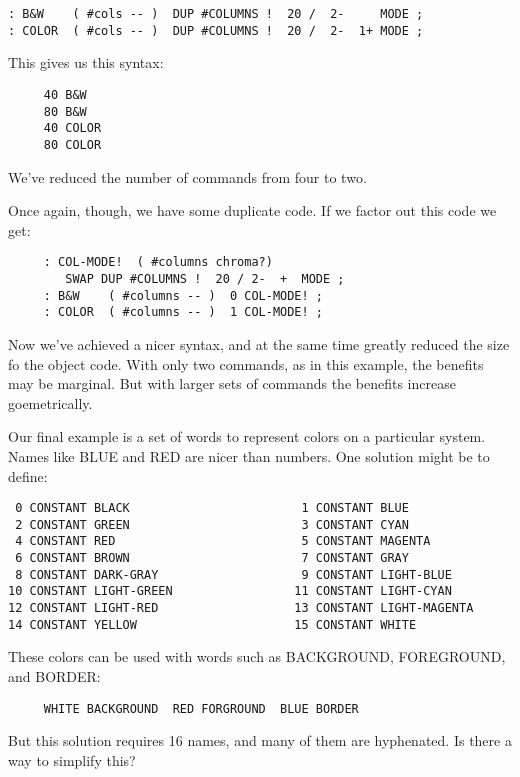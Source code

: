 \documentclass{book}
\begin{document}
\begin{verbatim}
: B&W    ( #cols -- )  DUP #COLUMNS !  20 /  2-     MODE ;
: COLOR  ( #cols -- )  DUP #COLUMNS !  20 /  2-  1+ MODE ;
\end{verbatim}

\noindent
This gives us this syntax:

\begin{verbatim}
     40 B&W
     80 B&W
     40 COLOR
     80 COLOR
\end{verbatim}

\noindent
We've reduced the number of commands from four to two.

Once again, though, we have some duplicate code. If we factor out this code we get:

\begin{verbatim}
     : COL-MODE!  ( #columns chroma?)
        SWAP DUP #COLUMNS !  20 / 2-  +  MODE ;
     : B&W    ( #columns -- )  0 COL-MODE! ;
     : COLOR  ( #columns -- )  1 COL-MODE! ;
\end{verbatim}
     
\noindent
Now we've achieved a nicer syntax, and at the same time greatly reduced the size fo the object code. With only two commands, as in this example, the benefits may be marginal. But with larger sets of commands the benefits increase goemetrically.

Our final example is a set of words to represent colors on a particular system. Names like BLUE and RED are nicer than numbers. One solution might be to define:

\begin{verbatim}
 0 CONSTANT BLACK                        1 CONSTANT BLUE
 2 CONSTANT GREEN                        3 CONSTANT CYAN
 4 CONSTANT RED                          5 CONSTANT MAGENTA
 6 CONSTANT BROWN                        7 CONSTANT GRAY
 8 CONSTANT DARK-GRAY                    9 CONSTANT LIGHT-BLUE
10 CONSTANT LIGHT-GREEN                 11 CONSTANT LIGHT-CYAN
12 CONSTANT LIGHT-RED                   13 CONSTANT LIGHT-MAGENTA
14 CONSTANT YELLOW                      15 CONSTANT WHITE
\end{verbatim}

\noindent
These colors can be used with words such as BACKGROUND, FOREGROUND, and BORDER:

\begin{verbatim}
     WHITE BACKGROUND  RED FORGROUND  BLUE BORDER
\end{verbatim}

\noindent
But this solution requires 16 names, and many of them are hyphenated. Is there a way to simplify this?
\end{document}
